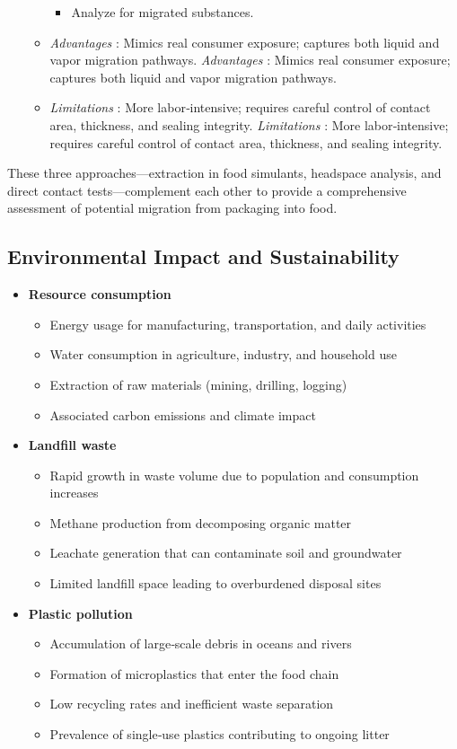 \begin{itemize}
\begin{itemize}
\begin{itemize}
\item Analyze for migrated substances.
    \end{itemize}
\item \textit{Advantages} : Mimics real consumer exposure; captures both liquid and vapor migration pathways.
\textit{Advantages} : Mimics real consumer exposure; captures both liquid and vapor migration pathways.
\item \textit{Limitations} : More labor‑intensive; requires careful control of contact area, thickness, and sealing integrity.
\textit{Limitations} : More labor‑intensive; requires careful control of contact area, thickness, and sealing integrity.
  \end{itemize}
\end{itemize}

These three approaches—extraction in food simulants, headspace analysis, and direct contact tests—complement each other to provide a comprehensive assessment of potential migration from packaging into food.

\subsection{Environmental Impact and Sustainability}

\begin{itemize}
\item \textbf{Resource consumption}
  \begin{itemize}
\item Energy usage for manufacturing, transportation, and daily activities
\item Water consumption in agriculture, industry, and household use
\item Extraction of raw materials (mining, drilling, logging)
\item Associated carbon emissions and climate impact
  \end{itemize}
\item \textbf{Landfill waste}
  \begin{itemize}
\item Rapid growth in waste volume due to population and consumption increases
\item Methane production from decomposing organic matter
\item Leachate generation that can contaminate soil and groundwater
\item Limited landfill space leading to overburdened disposal sites
  \end{itemize}
\item \textbf{Plastic pollution}
  \begin{itemize}
\item Accumulation of large‑scale debris in oceans and rivers
\item Formation of microplastics that enter the food chain
\item Low recycling rates and inefficient waste separation
\item Prevalence of single‑use plastics contributing to ongoing litter
  \end{itemize}
\end{itemize}

